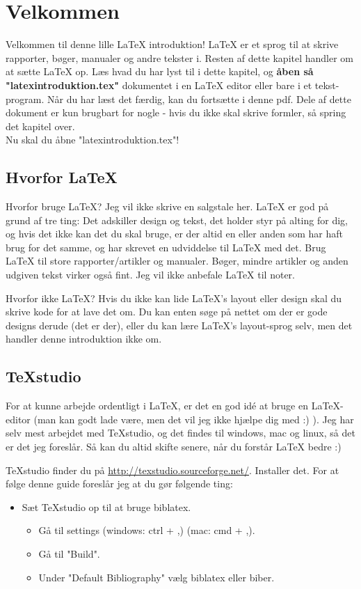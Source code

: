 \chapter{Velkommen}

Velkommen til denne lille LaTeX introduktion!  LaTeX er et sprog til at skrive rapporter, bøger, manualer og andre tekster i. Resten af dette kapitel handler om at sætte LaTeX op. Læs hvad du har lyst til i dette kapitel, og \textbf{åben så "latexintroduktion.tex"} dokumentet i en LaTeX editor eller bare i et tekst-program. Når du har læst det færdig, kan du fortsætte i denne pdf. Dele af dette dokument er kun brugbart for nogle - hvis du ikke skal skrive formler, så spring det kapitel over.\\

\noindent
Nu skal du åbne "latexintroduktion.tex"!

\section{Hvorfor LaTeX}
Hvorfor bruge LaTeX? Jeg vil ikke skrive en salgstale her. LaTeX er god på grund af tre ting: Det adskiller design og tekst, det holder styr på alting for dig, og hvis det ikke kan det du skal bruge, er der altid en eller anden som har haft brug for det samme, og har skrevet en udviddelse til LaTeX med det. Brug LaTeX til store rapporter/artikler og manualer. Bøger, mindre artikler og anden udgiven tekst virker også fint. Jeg vil ikke anbefale LaTeX til noter.

Hvorfor ikke LaTeX? Hvis du ikke kan lide LaTeX's layout eller design skal du skrive kode for at lave det om. Du kan enten søge på nettet om der er gode designs derude (det er der), eller du kan lære LaTeX's layout-sprog selv, men det handler denne introduktion ikke om.

\section{TeXstudio}
For at kunne arbejde ordentligt i LaTeX, er det en god idé at bruge en LaTeX-editor (man kan godt lade være, men det vil jeg ikke hjælpe dig med :) ). Jeg har selv mest arbejdet med TeXstudio, og det findes til windows, mac og linux, så det er det jeg foreslår. Så kan du altid skifte senere, når du forstår LaTeX bedre :)

TeXstudio finder du på \url{http://texstudio.sourceforge.net/}. Installer det. For at følge denne guide foreslår jeg at du gør følgende ting:
\begin{itemize}
\item Sæt TeXstudio op til at bruge biblatex.
\begin{itemize}
\item Gå til settings (windows: ctrl + ,) (mac: cmd + ,).
\item Gå til "Build".
\item Under "Default Bibliography" vælg biblatex eller biber.
\end{itemize}
\end{itemize}
